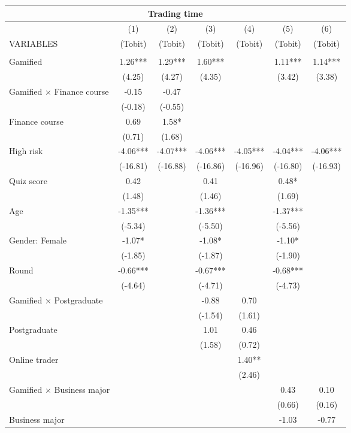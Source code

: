 \documentclass[]{article}
\begin{document}
\begin{tabular}{lcccccc}
\multicolumn{7}{c}{Trading time} \\ \hline
 & (1) & (2) & (3) & (4) & (5) & (6) \\
VARIABLES & (Tobit) & (Tobit) & (Tobit) & (Tobit) & (Tobit) & (Tobit) \\ \hline
 &  &  &  &  &  &  \\
Gamified & 1.26*** & 1.29*** & 1.60*** &  & 1.11*** & 1.14*** \\
 & (4.25) & (4.27) & (4.35) &  & (3.42) & (3.38) \\
Gamified $\times$ Finance course & -0.15 & -0.47 &  &  &  &  \\
 & (-0.18) & (-0.55) &  &  &  &  \\
Finance course & 0.69 & 1.58* &  &  &  &  \\
 & (0.71) & (1.68) &  &  &  &  \\
High risk & -4.06*** & -4.07*** & -4.06*** & -4.05*** & -4.04*** & -4.06*** \\
 & (-16.81) & (-16.88) & (-16.86) & (-16.96) & (-16.80) & (-16.93) \\
Quiz score & 0.42 &  & 0.41 &  & 0.48* &  \\
 & (1.48) &  & (1.46) &  & (1.69) &  \\
Age & -1.35*** &  & -1.36*** &  & -1.37*** &  \\
 & (-5.34) &  & (-5.50) &  & (-5.56) &  \\
Gender: Female & -1.07* &  & -1.08* &  & -1.10* &  \\
 & (-1.85) &  & (-1.87) &  & (-1.90) &  \\
Round & -0.66*** &  & -0.67*** &  & -0.68*** &  \\
 & (-4.64) &  & (-4.71) &  & (-4.73) &  \\
Gamified $\times$ Postgraduate &  &  & -0.88 & 0.70 &  &  \\
 &  &  & (-1.54) & (1.61) &  &  \\
Postgraduate &  &  & 1.01 & 0.46 &  &  \\
 &  &  & (1.58) & (0.72) &  &  \\
Online trader &  &  &  & 1.40** &  &  \\
 &  &  &  & (2.46) &  &  \\
Gamified $\times$ Business major &  &  &  &  & 0.43 & 0.10 \\
 &  &  &  &  & (0.66) & (0.16) \\
Business major &  &  &  &  & -1.03 & -0.77 \\

\end{tabular}
\end{document}

